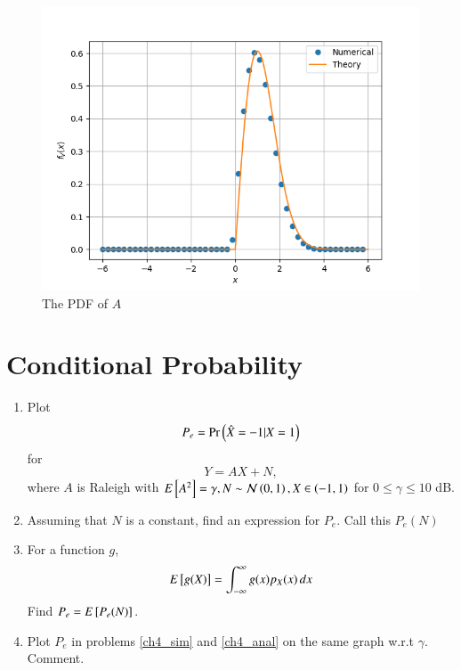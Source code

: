 \documentclass[journal,12pt,twocolumn]{IEEEtran}
\renewcommand\thesection{\arabic{section}}
\begin{document}
\begin{enumerate}[label=\thesection.\arabic*
,ref=\thesection.\theenumi]
    \begin{figure}
        \centering
        \includegraphics[width=\columnwidth]{./figures/PDF_ray.png}
        \caption{The PDF of $A$}
        \label{fig:ray_pdf}
        \end{figure}


       


\end{enumerate}
















\section{Conditional Probability}
\begin{enumerate}[label=\thesection.\arabic*
,ref=\thesection.\theenumi]
\item
\label{ch4_sim}
Plot 
\begin{equation}
P_e = \Pr\left(\hat{X} = -1|X=1\right)
\end{equation}
%
for 
\begin{equation}
Y = AX+N,
\end{equation}
where $A$ is Raleigh with $E{}\left[A^2\right] = \gamma, N \sim \mathcal{N}\left(0,1\right), X \in \left(-1,1\right)$ for $0 \le \gamma \le 10$ dB.
%
\item
Assuming that $N$ is a constant, find an expression for $P_e$.  Call this $P_e(N)$
%
\item
%
\label{ch4_anal}
For a function $g$,
\begin{equation}
E{}\left[g(X)\right] = \int_{-\infty}^{\infty}g(x)p_{X}(x)\, dx
\end{equation}
%
Find $P_e = E{}\left[P_e(N)\right]$.
%
\item
Plot $P_e$ in problems \ref{ch4_sim} and \ref{ch4_anal} on the same graph w.r.t $\gamma$.  Comment.
		\end{enumerate}
\end{document}
